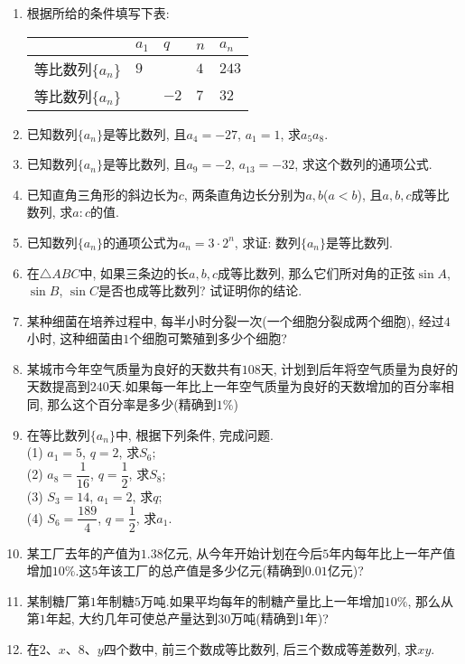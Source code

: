 \documentclass[10pt,a4paper]{article}
\begin{document}
\begin{enumerate}[1.]
\item 根据所给的条件填写下表:
\begin{center}
    \begin{tabular}{|p{}<{\centering}|p{}<{\centering}|p{}<{\centering}|p{}<{\centering}|p{}<{\centering}|}
        \hline
         & $a_1$ & $q$ & $n$ & $a_n$ \\ \hline
        等比数列$\{a_n\}$ & $9$ &  & $4$ & $243$  \\ \hline
        等比数列$\{a_n\}$ &  & $-2$ & $7$ & $32$ \\ \hline
    \end{tabular}
\end{center}
\item 已知数列$\{a_n\}$是等比数列, 且$a_4=-27$, $a_1=1$, 求$a_5a_8$.
\item 已知数列$\{a_n\}$是等比数列, 且$a_9=-2$, $a_{13}=-32$, 求这个数列的通项公式.
\item 已知直角三角形的斜边长为$c$, 两条直角边长分别为$a,b$($a<b$), 且$a,b,c$成等比数列, 求$a:c$的值.
\item 已知数列$\{a_n\}$的通项公式为$a_n=3\cdot 2^n$, 求证: 数列$\{a_n\}$是等比数列.
\item 在$\triangle ABC$中, 如果三条边的长$a,b,c$成等比数列, 那么它们所对角的正弦$\sin A$, $\sin B$, $\sin C$是否也成等比数列? 试证明你的结论.
\item 某种细菌在培养过程中, 每半小时分裂一次(一个细胞分裂成两个细胞), 经过$4$小时, 这种细菌由$1$个细胞可繁殖到多少个细胞?
\item 某城市今年空气质量为良好的天数共有$108$天, 计划到后年将空气质量为良好的天数提高到$240$天.如果每一年比上一年空气质量为良好的天数增加的百分率相同, 那么这个百分率是多少(精确到$1\%$)
\item 在等比数列$\{a_n\}$中, 根据下列条件, 完成问题.\\
(1) $a_1=5$, $q=2$, 求$S_6$;\\
(2) $a_8=\dfrac 1{16}$, $q=\dfrac 12$, 求$S_8$;\\
(3) $S_3=14$, $a_1=2$, 求$q$;\\
(4) $S_6=\dfrac{189}4$, $q=\dfrac 12$, 求$a_1$.
\item 某工厂去年的产值为$1.38$亿元, 从今年开始计划在今后$5$年内每年比上一年产值增加$10\%$.这$5$年该工厂的总产值是多少亿元(精确到$0.01$亿元)?
\item 某制糖厂第$1$年制糖$5$万吨.如果平均每年的制糖产量比上一年增加$10\%$, 那么从第$1$年起, 大约几年可使总产量达到$30$万吨(精确到$1$年)?
\item 在$2$、$x$、$8$、$y$四个数中, 前三个数成等比数列, 后三个数成等差数列, 求$xy$.

\end{enumerate}
\end{document}
